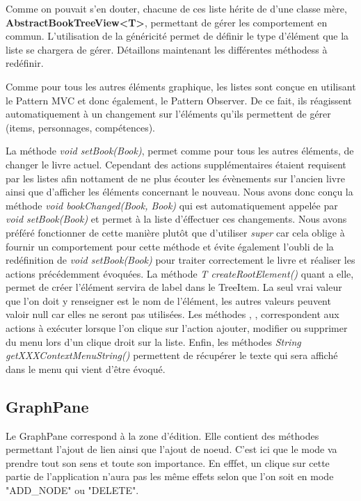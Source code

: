				Comme on pouvait s'en douter, chacune de ces liste hérite de d'une classe mère, \textbf{AbstractBookTreeView<T>}, permettant de gérer les comportement en commun. L'utilisation de la généricité permet de définir le type d'élément que la liste se chargera de gérer. Détaillons maintenant les différentes méthodess à redéfinir.

				Comme pour tous les autres éléments graphique, les listes sont conçue en utilisant le Pattern MVC et donc également, le Pattern Observer. De ce fait, ils réagissent automatiquement à un changement sur l'éléments qu'ils permettent de gérer (items, personnages, compétences).

				La méthode \textit{void setBook(Book)}, permet comme pour tous les autres éléments, de changer le livre actuel. Cependant des actions supplémentaires étaient requisent par les listes afin nottament de ne plus écouter les évènements sur l'ancien livre ainsi que d'afficher les éléments concernant le nouveau. Nous avons donc conçu la méthode \textit{void bookChanged(Book, Book)} qui est automatiquement appelée par \textit{void setBook(Book)} et permet à la liste d'éffectuer ces changements. Nous avons préféré fonctionner de cette manière plutôt que d'utiliser \textit{super} car cela oblige à fournir un comportement pour cette méthode et évite également l'oubli de la redéfinition de \textit{void setBook(Book)} pour traiter correctement le livre et réaliser les actions précédemment évoquées. La méthode \textit{T createRootElement()} quant a elle, permet de créer l'élément servira de label dans le TreeItem. La seul vrai valeur que l'on doit y renseigner est le nom de l'élément, les autres valeurs peuvent valoir null car elles ne seront pas utilisées. Les méthodes , ,  correspondent aux actions à exécuter lorsque l'on clique sur l'action ajouter, modifier ou supprimer du menu lors d'un clique droit sur la liste. Enfin, les méthodes \textit{String getXXXContextMenuString()} permettent de récupérer le texte qui sera affiché dans le menu qui vient d'être évoqué.

		\subsection{GraphPane}
			\label{sub:GraphPane}

			Le GraphPane correspond à la zone d'édition. Elle contient des méthodes permettant l'ajout de lien ainsi que l'ajout de noeud. C'est ici que le mode va prendre tout son sens et toute son importance. En efffet, un clique sur cette partie de l'application n'aura pas les même effets selon que l'on soit en mode "ADD\_NODE" ou "DELETE".

